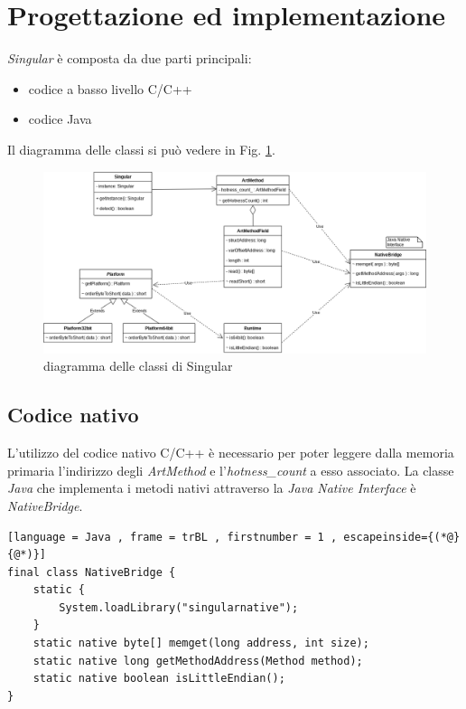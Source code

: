 \newpage

\section{Progettazione ed implementazione}

\emph{Singular} è composta da due parti principali: 
\begin{itemize}
    \item codice a basso livello C/C++
    \item codice Java
\end{itemize}

Il diagramma delle classi si può vedere in Fig. \ref{fig:singular_uml}.



\begin{figure} [H]
\includegraphics[width=1.2\textwidth]{figures/Singular}
\caption[Diagramma delle classi di Singular]{diagramma delle classi di Singular
\label{fig:singular_uml}}
\end{figure}

\subsection*{Codice nativo}

L'utilizzo del codice nativo C/C++ è necessario per poter leggere dalla memoria primaria l'indirizzo degli \emph{ArtMethod} e l'\emph{hotness\_count} a esso associato.
La classe \emph{Java} che implementa i metodi nativi attraverso la \emph{Java Native Interface} è \emph{NativeBridge}.

\begin{lstlisting}[language = Java , frame = trBL , firstnumber = 1 , escapeinside={(*@}{@*)}]
final class NativeBridge {
    static {
        System.loadLibrary("singularnative");
    }
    static native byte[] memget(long address, int size);
    static native long getMethodAddress(Method method);
    static native boolean isLittleEndian();
}
\end{lstlisting}

